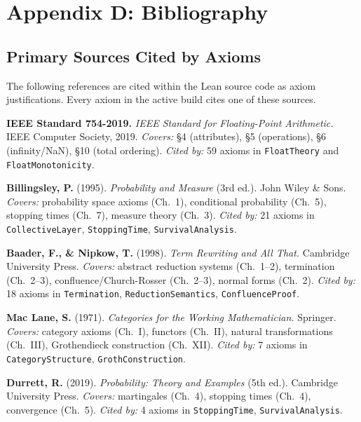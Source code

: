 \section{Appendix D: Bibliography}
\label{app:bibliography}

\subsection*{Primary Sources Cited by Axioms}

The following references are cited within the Lean source code as axiom
justifications. Every axiom in the active build cites one of these sources.

\medskip

\noindent\textbf{IEEE Standard 754-2019.}
\textit{IEEE Standard for Floating-Point Arithmetic.}
IEEE Computer Society, 2019.
\textit{Covers:} §4 (attributes), §5 (operations), §6 (infinity/NaN), §10 (total ordering).
\textit{Cited by:} 59 axioms in \texttt{FloatTheory} and \texttt{FloatMonotonicity}.

\medskip

\noindent\textbf{Billingsley, P.} (1995).
\textit{Probability and Measure} (3rd ed.).
John Wiley \& Sons.
\textit{Covers:} probability space axioms (Ch.~1), conditional probability (Ch.~5),
stopping times (Ch.~7), measure theory (Ch.~3).
\textit{Cited by:} 21 axioms in \texttt{CollectiveLayer}, \texttt{StoppingTime}, \texttt{SurvivalAnalysis}.

\medskip

\noindent\textbf{Baader, F., \& Nipkow, T.} (1998).
\textit{Term Rewriting and All That.}
Cambridge University Press.
\textit{Covers:} abstract reduction systems (Ch.~1--2), termination (Ch.~2--3),
confluence/Church-Rosser (Ch.~2--3), normal forms (Ch.~2).
\textit{Cited by:} 18 axioms in \texttt{Termination}, \texttt{ReductionSemantics}, \texttt{ConfluenceProof}.

\medskip

\noindent\textbf{Mac Lane, S.} (1971).
\textit{Categories for the Working Mathematician.}
Springer.
\textit{Covers:} category axioms (Ch.~I), functors (Ch.~II), natural transformations (Ch.~III),
Grothendieck construction (Ch.~XII).
\textit{Cited by:} 7 axioms in \texttt{CategoryStructure}, \texttt{GrothConstruction}.

\medskip

\noindent\textbf{Durrett, R.} (2019).
\textit{Probability: Theory and Examples} (5th ed.).
Cambridge University Press.
\textit{Covers:} martingales (Ch.~4), stopping times (Ch.~4), convergence (Ch.~5).
\textit{Cited by:} 4 axioms in \texttt{StoppingTime}, \texttt{SurvivalAnalysis}.

